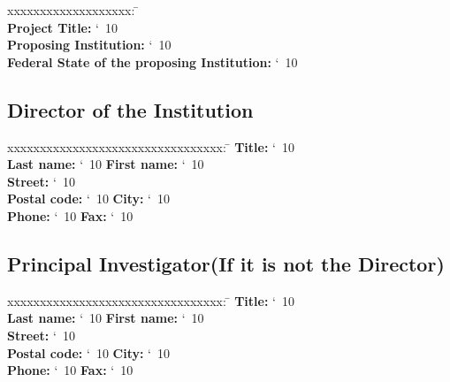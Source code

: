 \documentclass[accentcolor=tud9c,nochapname,11pt]{tudexercise}
\makeatletter
\newcommand\saferead[1]{%
  \bgroup
  \let\do\@makeother
  \dospecials\catcode`\ 10
  \egroup 
}
\makeatother
\begin{document}
\begin{Form}
\begin{tabbing}
xxxxxxxxxxxxxxxxxxx: \= \kill  \\%
\textbf{Project Title:}  \saferead{proj_title.txt} \\
\textbf{Proposing Institution:}  \saferead{prop_inst.txt} \\
\textbf{Federal State of the proposing Institution:}  \saferead{prop_state.txt} \\
\end{tabbing}
\subsection{Director of the Institution}
\begin{tabbing}
xxxxxxxxxxxxxxxxxxxxxxxxxxxxxxxxx:  \= \kill
\textbf{Title:}   \saferead{dir_title.txt} \\
\textbf{Last name:} \saferead{dir_lname.txt}  \> \>  \textbf{First name:} \saferead{dir_fname.txt}  \\
\textbf{Street:} \saferead{dir_street.txt}  \\
\textbf{Postal code:} \saferead{dir_pcode.txt}  \> \> \textbf{City:} \saferead{dir_city.txt}  \\
\textbf{Phone:} \saferead{dir_phone.txt} \> \> \textbf{Fax:} \saferead{dir_fax.txt}  \\
\end{tabbing}
\subsection{Principal Investigator(If it is not the Director)}
\begin{tabbing}
xxxxxxxxxxxxxxxxxxxxxxxxxxxxxxxxx:  \= \kill
\textbf{Title:} \saferead{pi_tite.txt} \\
\textbf{Last name:} \saferead{pi_lname.txt}  \> \>  \textbf{First name:} \saferead{pi_fname.txt}  \\
\textbf{Street:} \saferead{pi_street.txt}  \\
\textbf{Postal code:} \saferead{pi_pcode.txt}   \> \> \textbf{City:} \saferead{pi_city.txt}  \\
\textbf{Phone:} \saferead{pi_phone.txt}  \> \> \textbf{Fax:} \saferead{pi_fax.txt}  \\
\end{tabbing}

\end{Form}
\end{document}
